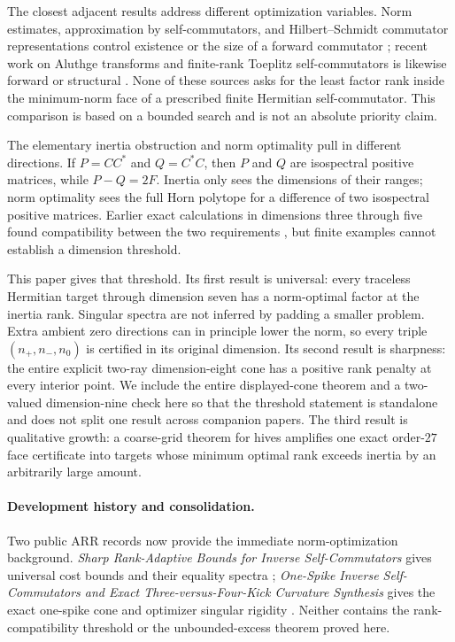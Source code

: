 \documentclass[11pt]{article}
\begin{document}
The closest adjacent results address different optimization variables.
Norm estimates, approximation by self-commutators, and Hilbert--Schmidt
commutator representations control existence or the size of a forward
commutator \cite{fong1986,maher2006,filonov2011,angel2015}; recent work on
Aluthge transforms and finite-rank Toeplitz self-commutators is likewise
forward or structural \cite{zhang2026,abhinand2026}.  None of these sources
asks for the least factor rank inside the minimum-norm face of a prescribed
finite Hermitian self-commutator.  This comparison is based on a bounded
search and is not an absolute priority claim.

The elementary inertia obstruction and norm optimality pull in different
directions.  If $P=CC^*$ and $Q=C^*C$, then $P$ and $Q$ are isospectral
positive matrices, while $P-Q=2F$.  Inertia only sees the dimensions of their
ranges; norm optimality sees the full Horn polytope for a difference of two
isospectral positive matrices.  Earlier exact calculations in dimensions
three through five found compatibility between the two requirements
\cite{erikssonQutrit,erikssonFour,erikssonFive}, but finite examples cannot
establish a dimension threshold.

This paper gives that threshold.  Its first result is universal: every
traceless Hermitian target through dimension seven has a norm-optimal factor
at the inertia rank.  Singular spectra are not inferred by padding a smaller
problem.  Extra ambient zero directions can in principle lower the norm, so
every triple $(n_+,n_-,n_0)$ is certified in its original dimension.  Its
second result is sharpness: the entire explicit two-ray dimension-eight cone has a positive
rank penalty at every interior point.  We include the entire displayed-cone theorem and
a two-valued dimension-nine check here so that the threshold statement is
standalone and does not split one result across companion papers.
The third result is qualitative growth: a coarse-grid theorem for hives
amplifies one exact order-$27$ face certificate into targets whose minimum
optimal rank exceeds inertia by an arbitrarily large amount.

\paragraph{Development history and consolidation.}
Two public ARR records now provide the immediate norm-optimization
background.  \emph{Sharp Rank-Adaptive Bounds for Inverse Self-Commutators}
gives universal cost bounds and their equality spectra
\cite{erikssonRankAdaptive}; \emph{One-Spike Inverse Self-Commutators and
Exact Three-versus-Four-Kick Curvature Synthesis} gives the exact one-spike
cone and optimizer singular rigidity \cite{erikssonOneSpike}.  Neither
contains the rank-compatibility threshold or the unbounded-excess theorem
proved here.
\end{document}
